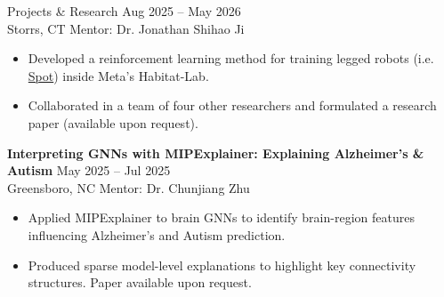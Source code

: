 \documentclass{resume}
\begin{document}

\begin{rSection}{Projects \& Research}
    \textbf{} \hfill Aug 2025 -- May 2026 \\
    Storrs, CT \hfill Mentor: Dr. Jonathan Shihao Ji
    \begin{itemize}
        \itemsep -4pt
        \item Developed a reinforcement learning method for training legged robots (i.e. \href{https://bostondynamics.com/products/spot/}{Spot}) inside Meta's Habitat-Lab.
        \item Collaborated in a team of four other researchers and formulated a research paper (available upon request).
    \end{itemize}

    \textbf{Interpreting GNNs with MIPExplainer: Explaining Alzheimer’s \& Autism} \hfill May 2025 -- Jul 2025 \\
    Greensboro, NC \hfill Mentor: Dr. Chunjiang Zhu
    \begin{itemize}
        \itemsep -4pt
        \item Applied MIPExplainer to brain GNNs to identify brain-region features influencing Alzheimer's and Autism prediction.
        \item Produced sparse model-level explanations to highlight key connectivity structures. Paper available upon request.
    \end{itemize}



\end{rSection}
\end{document}
